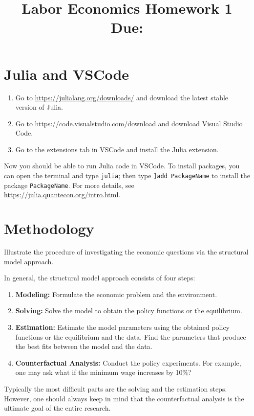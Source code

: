 \documentclass[12pt]{article}
\title{
    Labor Economics Homework 1 \\
    \large Due: \\
    }
\author{}
\date{}
\begin{document}

\maketitle
\vspace{-2cm}

\section{Julia and VSCode}
\begin{enumerate}
    \item Go to \url{https://julialang.org/downloads/} and download the latest stable version of Julia. 
    \item Go to \url{https://code.visualstudio.com/download} and download Visual Studio Code.
    \item Go to the extensions tab in VSCode and install the Julia extension.
\end{enumerate}
Now you should be able to run Julia code in VSCode. To install 
packages, you can open the terminal and type \texttt{julia}; then 
type \texttt{]add PackageName} to install the package 
\texttt{PackageName}. For more details, see 
\url{https://julia.quantecon.org/intro.html}.

\section{Methodology}
Illustrate the procedure of investigating the economic 
questions via the structural model approach.

\begin{sol}[2]
    In general, the structural model approach consists of four 
    steps:
    \begin{enumerate}
        \item \textbf{Modeling:} Formulate the economic problem 
        and the environment. 
        \item \textbf{Solving:} Solve the model to obtain the 
        policy functions or the equilibrium. 
        \item \textbf{Estimation:} Estimate the model parameters
        using the obtained policy functions or the equilibrium and 
        the data. Find the parameters that produce the best fits 
        between the model and the data. 
        \item \textbf{Counterfactual Analysis:} Conduct the 
        policy experiments. For example, one may ask what if 
        the minimum wage increases by 10\%?
    \end{enumerate}
    Typically the most difficult parts are the solving and the estimation 
    steps. However, one should always keep in mind that the 
    counterfactual analysis is the ultimate goal of the entire 
    research.
    \solend
\end{sol}
\end{document}
